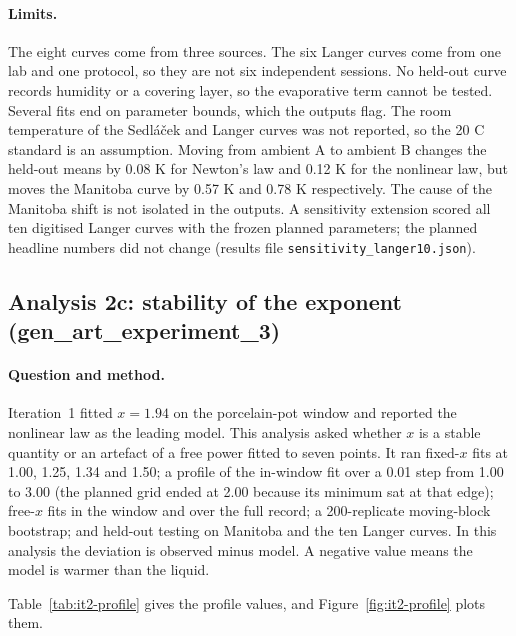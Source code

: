 \documentclass[11pt,letterpaper]{article}
\begin{document}
\paragraph{Limits.} The eight curves come from three sources. The six Langer curves come from one lab and one protocol, so they are not six independent sessions. No held-out curve records humidity or a covering layer, so the evaporative term cannot be tested. Several fits end on parameter bounds, which the outputs flag. The room temperature of the Sedl\'{a}\v{c}ek and Langer curves was not reported, so the 20 C standard is an assumption. Moving from ambient A to ambient B changes the held-out means by 0.08 K for Newton's law and 0.12 K for the nonlinear law, but moves the Manitoba curve by 0.57 K and 0.78 K respectively. The cause of the Manitoba shift is not isolated in the outputs. A sensitivity extension scored all ten digitised Langer curves with the frozen planned parameters; the planned headline numbers did not change (results file \texttt{sensitivity\_langer10.json}).

\subsection{Analysis 2c: stability of the exponent (gen\_art\_experiment\_3)}

\paragraph{Question and method.} Iteration~1 fitted $x = 1.94$ on the porcelain-pot window and reported the nonlinear law as the leading model. This analysis asked whether $x$ is a stable quantity or an artefact of a free power fitted to seven points. It ran fixed-$x$ fits at 1.00, 1.25, 1.34 and 1.50; a profile of the in-window fit over a 0.01 step from 1.00 to 3.00 (the planned grid ended at 2.00 because its minimum sat at that edge); free-$x$ fits in the window and over the full record; a 200-replicate moving-block bootstrap; and held-out testing on Manitoba and the ten Langer curves. In this analysis the deviation is observed minus model. A negative value means the model is warmer than the liquid.

Table~\ref{tab:it2-profile} gives the profile values, and Figure~\ref{fig:it2-profile} plots them.
\end{document}
